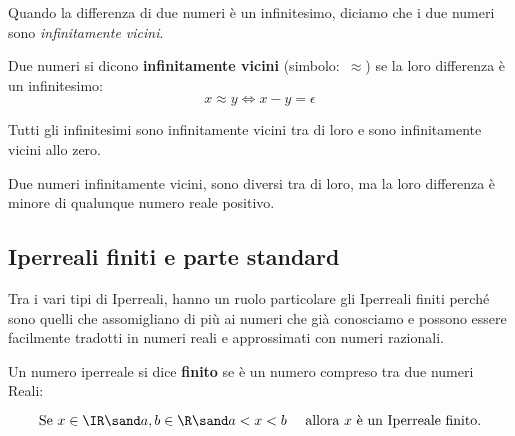 Quando la differenza di due numeri è un infinitesimo, diciamo 
che i due numeri sono \emph{infinitamente vicini}.

\begin{definizione}    %
Due numeri si dicono \textbf{infinitamente vicini} (simbolo:~\(\approx\)) se 
la loro differenza è un infinitesimo:
\[x \approx y \Leftrightarrow x - y = \epsilon\]
\end{definizione}

Tutti gli infinitesimi sono infinitamente vicini tra di loro e sono 
infinitamente vicini allo zero.

Due numeri infinitamente vicini, sono diversi tra di loro, ma la loro 
differenza è minore di qualunque numero reale positivo.

\subsection{Iperreali finiti e parte standard}
\label{subsec:insnum_partestandard}

Tra i vari tipi di Iperreali, hanno un ruolo particolare gli Iperreali 
finiti perché sono quelli che assomigliano di più ai numeri che già 
conosciamo e possono essere facilmente tradotti in numeri reali e 
approssimati con numeri razionali. 

\begin{definizione}
 Un numero iperreale si dice \textbf{finito} se è un numero compreso tra 
due numeri Reali:

\[\text{Se } x \in \IR \sand a, b \in \R \sand 
  a < x < b \quad \text{ allora } x \text{ è un Iperreale finito.}\]
\end{definizione}

